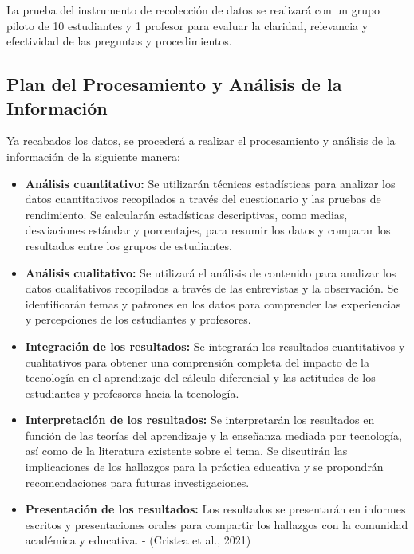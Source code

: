 \documentclass{article}
\begin{document}
La prueba del instrumento de recolección de datos se realizará con un grupo piloto de 10 estudiantes y 1 profesor para evaluar la claridad, relevancia y efectividad de las preguntas y procedimientos.

\subsection{Plan del Procesamiento y Análisis de la Información}

Ya recabados los datos, se procederá a realizar el procesamiento y análisis de la información de la siguiente manera:
\begin{itemize}
  \item \textbf{Análisis cuantitativo:} Se utilizarán técnicas estadísticas para analizar los datos cuantitativos recopilados a través del cuestionario y las pruebas de rendimiento. Se calcularán estadísticas descriptivas, como medias, desviaciones estándar y porcentajes, para resumir los datos y comparar los resultados entre los grupos de estudiantes.
  \item \textbf{Análisis cualitativo:} Se utilizará el análisis de contenido para analizar los datos cualitativos recopilados a través de las entrevistas y la observación. Se identificarán temas y patrones en los datos para comprender las experiencias y percepciones de los estudiantes y profesores.
  \item \textbf{Integración de los resultados:} Se integrarán los resultados cuantitativos y cualitativos para obtener una comprensión completa del impacto de la tecnología en el aprendizaje del cálculo diferencial y las actitudes de los estudiantes y profesores hacia la tecnología.
  \item \textbf{Interpretación de los resultados:} Se interpretarán los resultados en función de las teorías del aprendizaje y la enseñanza mediada por tecnología, así como de la literatura existente sobre el tema. Se discutirán las implicaciones de los hallazgos para la práctica educativa y se propondrán recomendaciones para futuras investigaciones.
  \item \textbf{Presentación de los resultados:} Los resultados se presentarán en informes escritos y presentaciones orales para compartir los hallazgos con la comunidad académica y educativa. \cite{Cristea} - (Cristea et al., 2021)
\end{itemize}

\newpage
\end{document}
